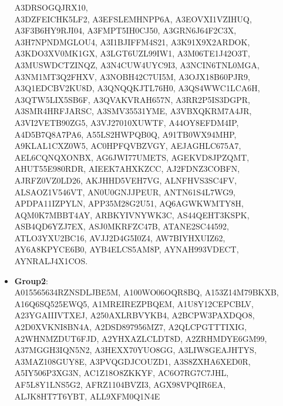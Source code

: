 \begin{itemize}
A3DRSOGQJRX10,\\ A3DZFEICHK5LF2, A3EFSLEMHNPP6A, A3EOVXI1VZIHUQ,\\ A3F3B6HY9RJI04, A3FMPT5IH0CJ50, A3GRN6J64F2C3X,\\ A3H7NPNDMGLOU4, A3I1BJIFFM4S21, A3K91X9X2ARDOK,\\ A3KDO3XV0MK1GX, A3LGT6UZL99IW1, A3M06TE1J42O3T,\\ A3MUSWDCTZINQZ, A3N4CUW4UYC9I3, A3NCIN6TNL0MGA,\\ A3NM1MT3Q2FHXV, A3NOBH42C7UI5M, A3OJX18B60PJR9,\\ A3Q1EDCBV2KU8D, A3QNQQKJTL76H0, A3QS4WWC1LCA6H,\\ A3QTW5LIX5SB6F, A3QVAKVRAH657N, A3RR2P5IS3DGPR,\\ A3SMR4HRFJARSC, A3SMV35531YME, A3VBXQKRM7A4JR,\\ A3VI2VETB90ZG5, A3VJ27010XUWTF, A44OY8EFDM4IP,\\ A4D5B7Q8A7PA6, A55LS2HWPQB0Q, A91TB0WX94MHP,\\ A9KLAL1CXZ0W5, AC0HPFQVBZVGY, AEJAGHLC675A7,\\ AEL6CQNQXONBX, AG6JWI77UMETS, AGEKVD8JPZQMT,\\ AHUT55E980RDR, AIEEK7AHXKZCC, AJ2FDNZ3COBFN,\\ AJRFZ0VZ0LD26, AKJHHD5VEH7VG, ALNFHVS3SC4FV,\\ ALSAOZ1V546VT, AN0U0GNJJPEUR, ANTN61S4L7WG9,\\ APDPA11IZPYLN, APP35M28G2U51, AQ6AGWKWMTY8H,\\ AQM0K7MBBT4AY, ARBKYIVNYWK3C, AS44QEHT3KSPK,\\ ASB4QD6YZJ7EX, ASJ0MKRFZC47B, ATANE2SC44592,\\ ATLO3YXU2BC16, AVJJ2D4G5I0Z4, AW7BIYHXUIZ62,\\ AY6A8KPYCE6B0, AYB4ELCS5AM8P, AYNAH993VDECT,\\ AYNRALJ4X1COS.
    
    \item \textbf{\hypertarget{Group2}{Group2}}: \\
    A015565634RZNSDLJBE5M, A100WO06OQR8BQ, A153Z14M79BKXB,\\ A16Q6SQ525EWQ5, A1MREIREZPBQEM, A1U8Y12CEPCBLV,\\ A23YGAIIIVTXEJ, A250AXLRBVYKB4, A2BCPW3PAXDQO8,\\ A2D0XVKNI8BN4A, A2DSD897956MZ7, A2QLCPGTTTIXIG,\\ A2WHNMZDUT6FJD, A2YHXAZLCLDT8D, A2ZRHMDYE6GM99,\\ A37MGGH3IQN5N2, A3HEXX70YUO8GG, A3LIW8GEAJHTYS,\\ A3MAZ108GUY8E, A3PVQGDJCOUZD1, A3S8ZXHA6XED0R,\\ A5IY506P3XG3N, AC1Z18O8ZKKYF, AC6O7RG7C7JHL,\\ AF5L8Y1LNS5G2, AFRZ1104BVZI3, AGX98VPQIR6EA,\\ ALJK8HT7T6YBT, ALL9XFM0Q1N4E


\end{itemize}
